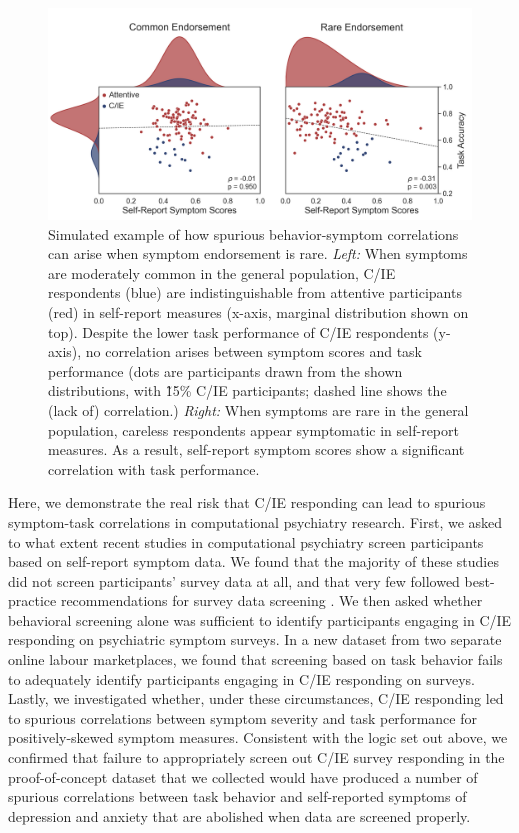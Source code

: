 \documentclass[a4paper,notitlepage,12pt]{article}
\begin{document}
\begin{figure}[t]
\includegraphics[width=16cm]{../figures/main_01.png}
\centering
\captionsetup{width=0.88\textwidth}
\caption{Simulated example of how spurious behavior-symptom correlations can arise when symptom endorsement is rare. \textit{Left:} When symptoms are moderately common in the general population, C/IE respondents (blue) are indistinguishable from attentive participants (red) in self-report measures (x-axis, marginal distribution shown on top). Despite the lower task performance of C/IE respondents (y-axis), no correlation arises between symptom scores and task performance (dots are participants drawn from the shown distributions, with \~15\% C/IE participants; dashed line shows the (lack of) correlation.) \textit{Right:} When symptoms are rare in the general population, careless respondents appear symptomatic in self-report measures. As a result, self-report symptom scores show a significant correlation with task performance.}
\label{fig:simulation}
\end{figure}

Here, we demonstrate the real risk that C/IE responding can lead to spurious symptom-task correlations in computational psychiatry research. First, we asked to what extent recent studies in computational psychiatry screen participants based on self-report symptom data. We found that the majority of these studies did not screen participants' survey data at all, and that very few followed best-practice recommendations for survey data screening \cite{barends2019noncompliant, thomas2017validity, hauser2016attentive}. We then asked whether behavioral screening alone was sufficient to identify participants engaging in C/IE responding on psychiatric symptom surveys. In a new dataset from two separate online labour marketplaces, we found that screening based on task behavior fails to adequately identify participants engaging in C/IE responding on surveys. Lastly, we investigated whether, under these circumstances, C/IE responding led to spurious correlations between symptom severity and task performance for positively-skewed symptom measures. Consistent with the logic set out above, we confirmed that failure to appropriately screen out C/IE survey responding in the proof-of-concept dataset that we collected would have produced a number of spurious correlations between task behavior and self-reported symptoms of depression and anxiety that are abolished when data are screened properly.
\end{document}
